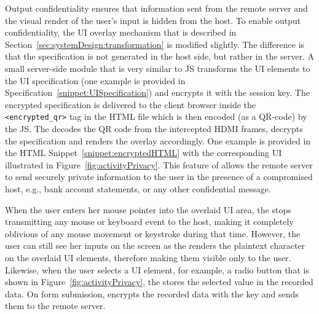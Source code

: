 \parasave
{} Output confidentiality ensures that information sent from the remote server and the visual render of the user's input is hidden from the host. To enable output confidentiality, the UI overlay mechanism that is described in Section~\ref{sec:systemDesign:transformation} is modified slightly. The difference is that the specification is not generated in the host side, but rather in the server.
A small server-side module that is very similar to \name JS transforms the UI elements to the UI specification (one example is provided in Specification~\ref{snippet:UISpecification}) and encrypts it with the \tls session key. 
The encrypted specification is delivered to the client browser inside the \texttt{<encrypted\_qr>} tag in the HTML file which is then encoded (as a QR-code) by the \name JS. The \device decodes the QR code from the intercepted HDMI frames, decrypts the specification and renders the overlay accordingly. One example is provided in the HTML Snippet~\ref{snippet:encryptedHTML} with the corresponding UI illustrated in Figure~\ref{fig:activityPrivacy}. 
This feature of \name allows the remote server to send securely private information to the user in the presence of a compromised host, e.g., bank account statements, or any other confidential message. 

\parasave
{} When the user enters her mouse pointer into the overlaid UI area, the \device stops transmitting any mouse or keyboard event to the host, making it completely oblivious of any mouse movement or keystroke during that time. 
However, the user can still see her inputs on the screen as the \device renders the plaintext character on the overlaid UI elements, therefore making them visible only to the user.
Likewise, when the user selects a UI element, for example, a radio button that is shown in Figure~\ref{fig:activityPrivacy}, the \device stores the selected value in the recorded data.
On form submission, \device encrypts the recorded data with the \tls key and sends them to the remote server.

